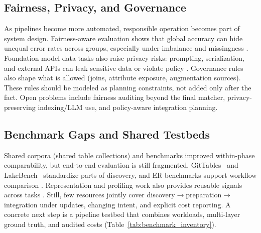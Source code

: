 \documentclass[sigconf,nonacm]{acmart}
\begin{document}
\subsection{Fairness, Privacy, and Governance}
As pipelines become more automated, responsible operation becomes part of system design. Fairness-aware evaluation shows that global accuracy can hide unequal error rates across groups, especially under imbalance and missingness \cite{10.14778/3611479.3611525}. Foundation-model data tasks also raise privacy risks: prompting, serialization, and external APIs can leak sensitive data or violate policy \cite{10.14778/3574245.3574258}. Governance rules also shape what is allowed (joins, attribute exposure, augmentation sources). These rules should be modeled as planning constraints, not added only after the fact. Open problems include fairness auditing beyond the final matcher, privacy-preserving indexing/LLM use, and policy-aware integration planning.

\subsection{Benchmark Gaps and Shared Testbeds}
Shared corpora (shared table collections) and benchmarks improved within-phase comparability, but end-to-end evaluation is still fragmented. GitTables~\cite{10.1145/3588710} and LakeBench~\cite{10.14778/3659437.3659448} standardize parts of discovery, and ER benchmarks support workflow comparison \cite{10184692}. Representation and profiling work also provides reusable signals across tasks \cite{10184556,10.1145/3588929}. Still, few resources jointly cover discovery$\rightarrow$preparation$\rightarrow$integration under updates, changing intent, and explicit cost reporting. A concrete next step is a pipeline testbed that combines workloads, multi-layer ground truth, and audited costs (Table~\ref{tab:benchmark_inventory}).
\end{document}
